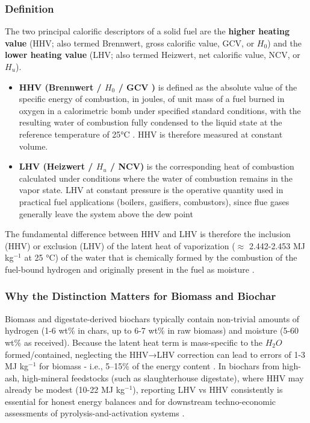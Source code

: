 \subsubsection*{Definition}
The two principal calorific descriptors of a solid fuel are the \textbf{higher heating value} (HHV; also termed Brennwert, gross calorific value, GCV, or $H_0$) and the \textbf{lower heating value} (LHV; also termed Heizwert, net calorific value, NCV, or $H_u$).
\begin{itemize}
    \item \textbf{HHV (Brennwert /  $H_0$ / GCV )} is defined as the absolute value of the specific energy of combustion, in joules, of unit mass of a fuel burned in oxygen in a calorimetric bomb under specified standard conditions, with the resulting water of combustion fully condensed to the liquid state at the reference temperature of 25°C \cite{iso18125_2017,din51900_2023,astm_d5865_2019}. HHV is therefore measured at constant volume.
    \item \textbf{LHV (Heizwert / $H_u$ / NCV)} is the corresponding heat of combustion calculated under conditions where the water of combustion remains in the vapor state. LHV at constant pressure is the operative quantity used in practical fuel applications (boilers, gasifiers, combustors), since flue gases generally leave the system above the dew point \cite{iso18125_2017, din51900_old,van-loo-2008}
\end{itemize}

The fundamental difference between HHV and LHV is therefore the inclusion (HHV) or exclusion (LHV) of the latent heat of vaporization ($\approx$ 2.442-2.453 MJ kg$^{-1}$ at 25 °C) of the water that is chemically formed by the combustion of the fuel-bound hydrogen and originally present in the fuel as moisture \cite{basu-2018,channiwala-2002}.

\subsubsection*{Why the Distinction Matters for Biomass and Biochar}
Biomass and digestate-derived biochars typically contain non-trivial amounts of hydrogen (1-6 wt\% in chars, up to 6-7 wt\% in raw biomass) and moisture (5-60 wt\% as received). Because the latent heat term is mass-specific to the $H_2O$ formed/contained, neglecting the HHV→LHV correction can lead to errors of 1-3 MJ kg$^{-1}$ for biomass - i.e., 5–15\% of the energy content \cite{van-loo-2008,vargas-moreno-2012}. In biochars from high-ash, high-mineral feedstocks (such as slaughterhouse digestate), where HHV may already be modest (10-22 MJ kg$^{-1}$), reporting LHV vs HHV consistently is essential for honest energy balances and for downstream techno-economic assessments of pyrolysis-and-activation systems \cite{Lehmann2015}.

